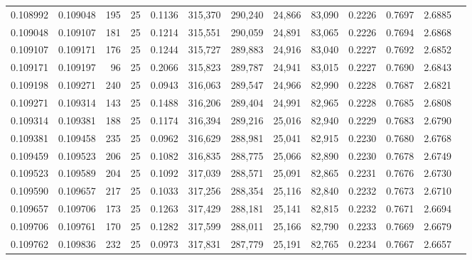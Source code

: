 \begin{tabular}{rrrrrrrrrrrrr}
0.108992 & 0.109048 &   195 &  25 &                                     0.1136 & 315,370 & 290,240 &  24,866 &  83,090 & 0.2226 & 0.7697 & 2.6885 \\
0.109048 & 0.109107 &   181 &  25 &                                     0.1214 & 315,551 & 290,059 &  24,891 &  83,065 & 0.2226 & 0.7694 & 2.6868 \\
0.109107 & 0.109171 &   176 &  25 &                                     0.1244 & 315,727 & 289,883 &  24,916 &  83,040 & 0.2227 & 0.7692 & 2.6852 \\
0.109171 & 0.109197 &    96 &  25 &                                     0.2066 & 315,823 & 289,787 &  24,941 &  83,015 & 0.2227 & 0.7690 & 2.6843 \\
0.109198 & 0.109271 &   240 &  25 &                                     0.0943 & 316,063 & 289,547 &  24,966 &  82,990 & 0.2228 & 0.7687 & 2.6821 \\
0.109271 & 0.109314 &   143 &  25 &                                     0.1488 & 316,206 & 289,404 &  24,991 &  82,965 & 0.2228 & 0.7685 & 2.6808 \\
0.109314 & 0.109381 &   188 &  25 &                                     0.1174 & 316,394 & 289,216 &  25,016 &  82,940 & 0.2229 & 0.7683 & 2.6790 \\
0.109381 & 0.109458 &   235 &  25 &                                     0.0962 & 316,629 & 288,981 &  25,041 &  82,915 & 0.2230 & 0.7680 & 2.6768 \\
0.109459 & 0.109523 &   206 &  25 &                                     0.1082 & 316,835 & 288,775 &  25,066 &  82,890 & 0.2230 & 0.7678 & 2.6749 \\
0.109523 & 0.109589 &   204 &  25 &                                     0.1092 & 317,039 & 288,571 &  25,091 &  82,865 & 0.2231 & 0.7676 & 2.6730 \\
0.109590 & 0.109657 &   217 &  25 &                                     0.1033 & 317,256 & 288,354 &  25,116 &  82,840 & 0.2232 & 0.7673 & 2.6710 \\
0.109657 & 0.109706 &   173 &  25 &                                     0.1263 & 317,429 & 288,181 &  25,141 &  82,815 & 0.2232 & 0.7671 & 2.6694 \\
0.109706 & 0.109761 &   170 &  25 &                                     0.1282 & 317,599 & 288,011 &  25,166 &  82,790 & 0.2233 & 0.7669 & 2.6679 \\
0.109762 & 0.109836 &   232 &  25 &                                     0.0973 & 317,831 & 287,779 &  25,191 &  82,765 & 0.2234 & 0.7667 & 2.6657 \\

\end{tabular}
